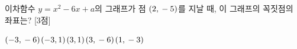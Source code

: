 이차함수 $y=x^2-6x+a$의 그래프가 점 $(2{,}\mkern3mu -5)$를 지날 때, 이 그래프의 꼭짓점의 좌표는?  \mbox{[3점]}
\begin{choices32}{$(-3{,}\mkern3mu -6)$}{$(-3{,}\mkern3mu 1)$}{$(3{,}\mkern3mu 1)$}{$(3{,}\mkern3mu -6)$}{$(1{,}\mkern3mu -3)$}\end{choices32}
